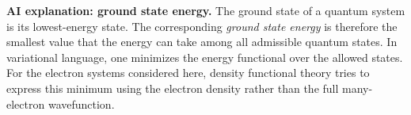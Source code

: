 \medskip\noindent
{\bf AI explanation: ground state energy.}
The ground state of a quantum system is its
lowest-energy state. The corresponding
{\it ground state energy} is therefore the
smallest value that the energy can take
among all admissible quantum states. In
variational language, one minimizes the
energy functional over the allowed states.
For the electron systems considered here,
density functional theory tries to express
this minimum using the electron density
rather than the full many-electron
wavefunction.





